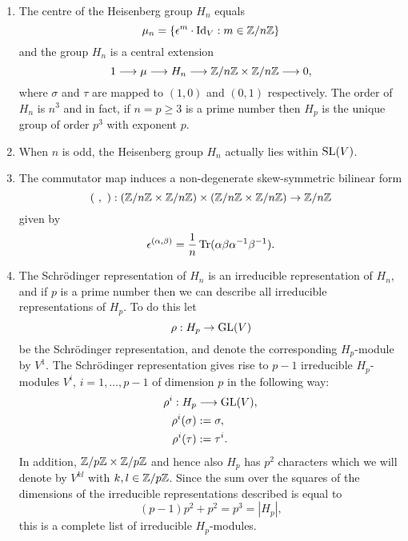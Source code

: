 \begin{remark}
	\begin{enumerate}
		\item The centre of the Heisenberg group $H_{n}$ equals
		\begin{equation*}
		\mu_{n} = \{ \epsilon^{m} \cdot\operatorname{Id}_{V} : m \in \mathbb{Z}/n\mathbb{Z}  \}
		\end{equation*}
		and the group $H_{n}$ is a central extension
		\begin{equation*}
		1 \longrightarrow \mu \longrightarrow H_{n} \longrightarrow \mathbb{Z}/n\mathbb{Z} \times \mathbb{Z}/n\mathbb{Z} \longrightarrow 0,
		\end{equation*}
		where $\sigma$ and $\tau$ are mapped to $(1,0)$ and $(0,1)$ respectively. The order of $H_{n}$ is $n^{3}$ and in fact, if $n = p \geq 3$ is a prime number then $H_{p}$ is the unique group of order $p^{3}$ with exponent $p$.
		
		\item When $n$ is odd, the Heisenberg group $H_{n}$ actually lies within $\operatorname{SL}(V)$.
		
		\item The commutator map induces a non-degenerate skew-symmetric bilinear form
		\begin{equation*}
			(\ ,\ ):(\mathbb{Z}/n\mathbb{Z}\times \mathbb{Z}/n\mathbb{Z}) \times (\mathbb{Z}/n\mathbb{Z} \times \mathbb{Z}/n\mathbb{Z}) \rightarrow \mathbb{Z}/n\mathbb{Z}
		\end{equation*}
		given by
		\begin{equation}
			\label{commutator}
			\epsilon^{(\alpha,\beta)} = \frac{1}{n}\operatorname{Tr}(\alpha\beta \alpha^{-1}\beta^{-1}).
		\end{equation}
				
		\item The Schr{\"o}dinger representation of $H_{n}$ is an irreducible representation of $H_{n}$, and if $p$ is a prime number then we can describe all irreducible representations of $H_{p}$. To do this let
		\begin{equation*}
			\rho: H_{p} \rightarrow \operatorname{GL}(V)
		\end{equation*}
		be the Schr{\"o}dinger representation, and denote the corresponding $H_{p}$-module by $V^{1}$. The Schr{\"o}dinger representation gives rise to $p-1$ irreducible $H_{p}$-modules $V^{i}$, $i = 1,\ldots, p-1$ of dimension $p$ in the following way:
		\begin{equation*}
			\begin{split}
			\rho^{i}: H_{p} &\longrightarrow \operatorname{GL}(V),\\
			\rho^{i}(\sigma) &:= \sigma,\\
			\rho^{i}(\tau) &:= \tau^{i}.
			\end{split}
		\end{equation*}
		In addition, $\mathbb{Z}/p\mathbb{Z} \times \mathbb{Z}/p\mathbb{Z}$ and hence also $H_{p}$ has $p^{2}$ characters which we will denote by $V^{kl}$ with $k,l \in \mathbb{Z}/p\mathbb{Z}$. Since the sum over the squares of the dimensions of the irreducible representations described is equal to
		\begin{equation*}
			(p-1)p^{2} + p^{2} = p^{3} = |H_{p}|,
		\end{equation*}
		this is a complete list of irreducible $H_{p}$-modules.
		

\end{enumerate}
\end{remark}
